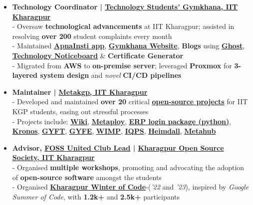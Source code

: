 \documentclass[a4paper,10pt]{extarticle} %
\begin{document}
\begin{itemize}[leftmargin=0.55cm, rightmargin=0.2cm, label={\Large\textbullet}]

\item \textbf{Technology Coordinator | \href{https://gymkhana.iitkgp.ac.in/}{Technology Students' Gymkhana, IIT Kharagpur}}\\
- Oversaw \textbf{technological advancements} at IIT Kharagpur;  assisted in resolving \textbf{over 200} student complaints every month \\
- Maintained \href{https://play.google.com/store/apps/details?id=com.apnainsti&pli=1}{\textbf{ApnaInsti app}}, \href{https://gymkhana.iitkgp.ac.in/}{\textbf{Gymkhana Website}}, \textbf{Blogs} using \href{https://ghost.org/}{\textbf{Ghost}}, \href{https://github.com/tsg-iitkgp/noticeboard}{\textbf{Technology Noticeboard}} \& \textbf{Certificate Generator} \\
- Migrated from \textbf{AWS} to \textbf{on-premise server}; leveraged \textbf{Proxmox} for \textbf{3-layered system design} and \textit{novel} \textbf{CI/CD pipelines}

\item \textbf{Maintainer | \href{https://metakgp.org/}{Metakgp, IIT Kharagpur}}\\
- Developed and maintained \textbf{over 20} critical \textbf{\href{https://github.com/metakgp}{open-source projects}} for IIT KGP students, easing out stressful processes \\
- Projects include: \href{https://wiki.metakgp.org}{\textbf{Wiki}}, \href{https://github.com/metakgp/metaploy}{\textbf{Metaploy}}, \href{https://pypi.org/project/iitkgp-erp-login/}{\textbf{ERP login package (python)}}, \href{http://kronos.streamlit.app}{\textbf{Kronos}}, \href{https://gyft.metakgp.org}{\textbf{GYFT}}, \href{https://gyfe.metakgp.org}{\textbf{GYFE}}, \href{https://github.com/metakgp/wimp}{\textbf{WIMP}}, \href{https://qp.metakgp.org}{\textbf{IQPS}}, \href{https://heimdall.metakgp.org}{\textbf{Heimdall}}, \href{https://github.com/proffapt/Metahub}{\textbf{Metahub}}

\item \textbf{Advisor, \href{https://fossunited.org/clubs}{\textbf{FOSS United Club Lead}} | \href{https://kossiitkgp.org}{Kharagpur Open Source Society, IIT Kharagpur}}\\
- Organised \textbf{multiple workshops}, promoting and advocating the adoption of \textbf{open-source software} amongst the students \\
- Organised \textbf{\href{https://kwoc.kossiitkgp.org/}{Kharagpur Winter of Code}}-(\textit{'22} and \textit{'23}), inspired by \textit{Google Summer of Code}, with \textbf{1.2k+} and \textbf{2.5k+} participants

\end{itemize}
\end{document}
